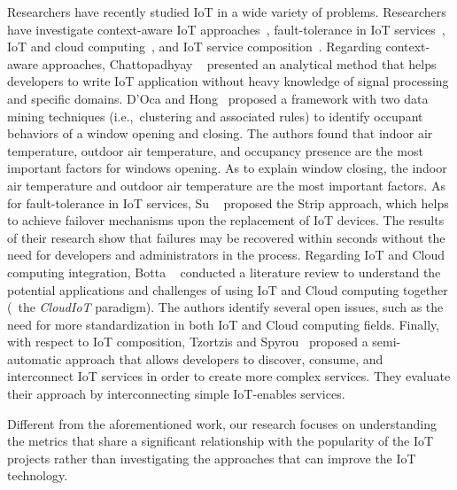 Researchers have recently studied IoT in a wide variety of problems.
Researchers have investigate context-aware IoT
approaches~\cite{chattopadhyay2015way,d2014data,nambi2014unified,jin2014information,perera2014context,bauman2014discovering,barnaghi2016searching,li2014qos},
fault-tolerance in IoT
services~\cite{su2014decentralized,reijers2013design,zhou2015supporting}, IoT
and cloud
computing~\cite{botta2014integration,kamilaris2011smart,rao2012cloud,fox2012architecture,zaslavsky2013sensing},
and IoT service
composition~\cite{florescu2003xl,billet2014task,hachem2011ontologies,alam2010senaas,tzortzis2016semi,de2012internet,zhang2017service,huang2015context,eisenhauer2010hydra,
	su2014decentralized,patel2015enabling}.
Regarding context-aware approaches, Chattopadhyay \etal~\cite{chattopadhyay2015way} presented an
analytical method that helps developers to write IoT application without heavy
knowledge of signal processing and specific
domains. D'Oca and Hong~\cite{d2014data} proposed a
framework with two data mining techniques (i.e.,~clustering and associated
rules) to identify occupant behaviors of a window opening and closing. The
authors found that indoor air temperature, outdoor air temperature, and
occupancy presence are the most important factors for windows opening. As to
explain window closing, the indoor air temperature and outdoor air temperature
are the most important factors. As for fault-tolerance in IoT services, Su \etal~\cite{su2014decentralized} proposed the Strip approach, which helps to achieve failover mechanisms upon the replacement of IoT devices. The results of their research show that failures may be recovered within seconds without the need for developers and administrators in
the process. Regarding IoT and Cloud computing
integration, Botta \etal~\cite{botta2014integration} conducted a literature
review to understand the potential applications and challenges of using IoT and
Cloud computing together (\ie~the {\em CloudIoT} paradigm). The authors
identify several open issues, such as the need for more standardization in both
IoT and Cloud computing fields. Finally, with respect to IoT composition,
Tzortzis and Spyrou~\cite{tzortzis2016semi} proposed a semi-automatic approach
that allows developers to discover, consume, and interconnect IoT services in
order to create more complex services. They evaluate their approach by
interconnecting simple IoT-enables services.%

Different from the aforementioned work, our research focuses on understanding the metrics that share a significant relationship with the popularity of the IoT projects rather than investigating the approaches that can improve the IoT technology.


